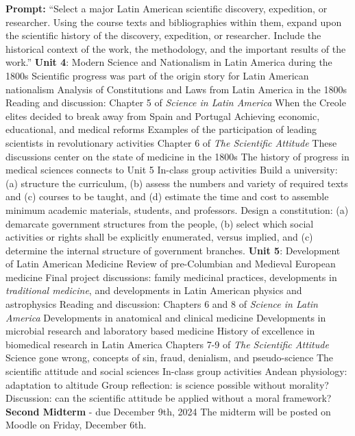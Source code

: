 \documentclass[10pt]{article}
\begin{document}
\begin{outline}[enumerate]
\2 \textbf{Prompt:} ``Select a major Latin American scientific discovery, expedition, or researcher.  Using the course texts and bibliographies within them, expand upon the scientific history of the discovery, expedition, or researcher.  Include the historical context of the work, the methodology, and the important results of the work.''
\1 \textbf{Unit 4}: Modern Science and Nationalism in Latin America during the 1800s
\2 Scientific progress was part of the origin story for Latin American nationalism
\2 Analysis of Constitutions and Laws from Latin America in the 1800s
\2 Reading and discussion:
\3 Chapter 5 of \textit{Science in Latin America}
\4 When the Creole elites decided to break away from Spain and Portugal
\4 Achieving economic, educational, and medical reforms
\4 Examples of the participation of leading scientists in revolutionary activities
\3 Chapter 6 of \textit{The Scientific Attitude}
\4 These discussions center on the state of medicine in the 1800s
\4 The history of progress in medical sciences connects to Unit 5
\2 In-class group activities
\3 Build a university: (a) structure the curriculum, (b) assess the numbers and variety of required texts and (c) courses to be taught, and (d) estimate the time and cost to assemble minimum academic materials, students, and professors.
\3 Design a constitution: (a) demarcate government structures from the people, (b) select which social activities or rights shall be explicitly enumerated, versus implied, and (c) determine the internal structure of government branches.
\1 \textbf{Unit 5}: Development of Latin American Medicine
\2 Review of pre-Columbian and Medieval European medicine
\2 Final project discussions: family medicinal practices, developments in \textit{traditional medicine}, and developments in Latin American physics and astrophysics
\2 Reading and discussion:
\3 Chapters 6 and 8 of \textit{Science in Latin America}
\4 Developments in anatomical and clinical medicine
\4 Developments in microbial research and laboratory based medicine
\4 History of excellence in biomedical research in Latin America
\3 Chapters 7-9 of \textit{The Scientific Attitude}
\4 Science gone wrong, concepts of sin, fraud, denialism, and pseudo-science
\4 The scientific attitude and social sciences
\2 In-class group activities
\3 Andean physiology: adaptation to altitude
\3 Group reflection: is science possible without morality?
\3 Discussion: can the scientific attitude be applied without a moral framework?
\1 \textbf{Second Midterm} - due December 9th, 2024
\2 The midterm will be posted on Moodle on Friday, December 6th.

\end{outline}
\end{document}
